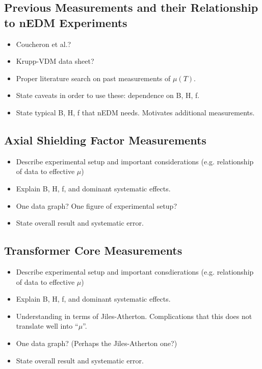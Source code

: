 \documentclass[review]{elsarticle}
\begin{document}
\subsection{Previous Measurements and their Relationship to nEDM Experiments}

\begin{itemize}
\item Coucheron et al.?
\item Krupp-VDM data sheet?
\item Proper literature search on past measurements of $\mu(T)$.
\item State caveats in order to use these:  dependence on B, H, f.
\item State typical B, H, f that nEDM needs.  Motivates additional
  measurements.
\end{itemize}

\subsection{Axial Shielding Factor Measurements}

\begin{itemize}
\item Describe experimental setup and important considerations
  (e.g. relationship of data to effective $\mu$)
\item Explain B, H, f, and dominant systematic effects.
\item One data graph?  One figure of experimental setup?
\item State overall result and systematic error.
\end{itemize}

\subsection{Transformer Core Measurements}

\begin{itemize}
\item Describe experimental setup and important consdierations (e.g. relationship of data to effective $\mu$)
\item Explain B, H, f, and dominant systematic effects.
\item Understanding in terms of Jiles-Atherton.  Complications that
  this does not translate well into ``$\mu$''.
\item One data graph?  (Perhaps the Jiles-Atherton one?)
\item State overall result and systematic error.
\end{itemize}
\end{document}
